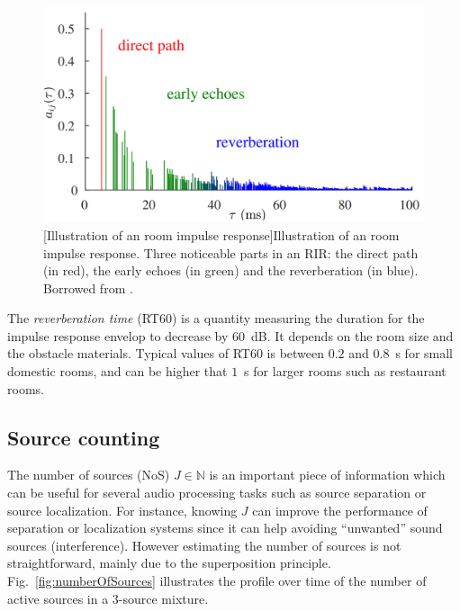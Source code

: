 \begin{figure}[t]
    \begin{center}
    \includegraphics[width=0.6\linewidth]{Images/chap1/impulseResponse.png}
    [Illustration of an room impulse response]{Illustration of an room impulse response. Three noticeable parts in an RIR: the direct path (in red), the early echoes (in green) and the reverberation (in blue). Borrowed from \cite{vincent_audio_2018}.}
    \label{fig:impulseResponse}
    \end{center}
\end{figure}

The \textit{reverberation time} (RT60) is a quantity measuring the duration for the impulse response envelop to decrease by $60$~dB. It depends on the room size and the obstacle materials. Typical values of RT60 is between $0.2$ and $0.8$~s for small domestic rooms, and can be higher that $1$~s for larger rooms such as restaurant rooms.

\subsection{Source counting}
\label{ss:sourceCounting}

The number of sources (NoS) $J \in \mathbb{N}$ is an important piece of information which can be useful for several audio processing tasks such as source separation or source localization. For instance, knowing $J$ can improve the performance of separation or localization systems since it can help avoiding ``unwanted'' sound sources (interference). However estimating the number of sources is not straightforward, mainly due to the superposition principle. Fig.~\ref{fig:numberOfSources} illustrates the profile over time of the number of active sources in a 3-source mixture.

